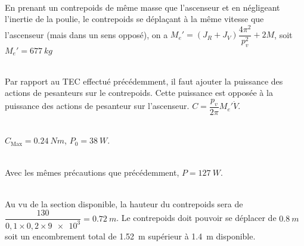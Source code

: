 \begin{multicols}{2}
\begin{corrige}
\end{corrige}
\else
\fi

\ifprof
\begin{corrige}~\\
En prenant un contrepoids de même masse que l'ascenseur et en négligeant l'inertie de la poulie, le contrepoids se déplaçant à la même vitesse que l'ascenseur (mais dans un sens opposé), on a
$M_e' = \left( J_R+J_V\right) \dfrac{4\pi^2}{p_v^2} +2M$, soit $M_e' = \SI{677}{kg}$
\end{corrige}
\else
\fi

\ifprof
\begin{corrige}~\\
Par rapport au TEC effectué précédemment, il faut ajouter la puissance des actions de pesanteurs sur le contrepoids.
Cette puissance est opposée à la puissance des actions de pesanteur sur l'ascenseur.
 $C = \dfrac{p_v}{2\pi}M_e' \dot{V}$.
 
\end{corrige}
\else
\fi

\ifprof
\begin{corrige}~\\
$C_{\text{Max}} = \SI{0,24}{Nm}$, $P_0 = \SI{38}{W}$.

\end{corrige}
\else
\fi

\ifprof
\begin{corrige}~\\
Avec les mêmes précautions que précédemment, $P=\SI{127}{W}$. 
\end{corrige}
\else
\fi



\ifprof
\begin{corrige}~\\
Au vu de la section disponible, la hauteur du contrepoids sera de $\dfrac{130}{0,1\times 0,2 \times \num{9e3}}=\SI{0,72}{m}$. Le contrepoids doit pouvoir se déplacer de $\SI{0,8}{m}$ soit un encombrement total de \SI{1,52}{m}  supérieur à \SI{1,4}{m} disponible.
\end{corrige}
\else
\fi


\end{multicols}
